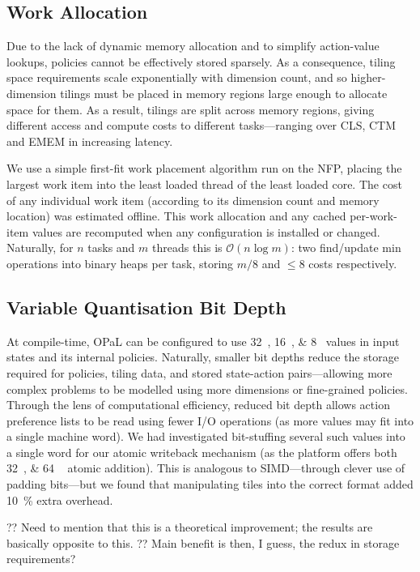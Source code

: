 \documentclass[sigconf,natbib=false]{acmart}
\newcommand{\approachshort}{OPaL}
\begin{document}
\subsection{Work Allocation}
Due to the lack of dynamic memory allocation and to simplify action-value lookups, policies cannot be effectively stored sparsely.
As a consequence, tiling space requirements scale exponentially with dimension count, and so higher-dimension tilings must be placed in memory regions large enough to allocate space for them.
As a result, tilings are split across memory regions, giving different access and compute costs to different tasks---ranging over CLS, CTM and EMEM in increasing latency.

We use a simple first-fit work placement algorithm run on the NFP, placing the largest work item into the least loaded thread of the least loaded core.
The cost of any individual work item (according to its dimension count and memory location) was estimated offline.
This work allocation and any cached per-work-item values are recomputed when any configuration is installed or changed.
Naturally, for $n$ tasks and $m$ threads this is $\mathcal{O}{\left(n\log{m}\right)}$: two find/update min operations into binary heaps per task, storing $m/8$ and $\le8$ costs respectively.

\subsection{Variable Quantisation Bit Depth}
At compile-time, \approachshort{} can be configured to use \SIlist[list-final-separator = { \translate{or} }]{32;16;8}{\bit} values in input states and its internal policies.
Naturally, smaller bit depths reduce the storage required for policies, tiling data, and stored state-action pairs---allowing more complex problems to be modelled using more dimensions or fine-grained policies.
Through the lens of computational efficiency, reduced bit depth allows action preference lists to be read using fewer I/O operations (as more values may fit into a single machine word).
We had investigated bit-stuffing several such values into a single word for our atomic writeback mechanism (as the platform offers both \SIlist{32;64
}{\bit} atomic addition).
This is analogous to SIMD---through clever use of padding bits---but we found that manipulating tiles into the correct format added \SI{10}{\percent} extra overhead.

?? Need to mention that this is a theoretical improvement; the results are basically opposite to this.
?? Main benefit is then, I guess, the redux in storage requirements?
\end{document}
